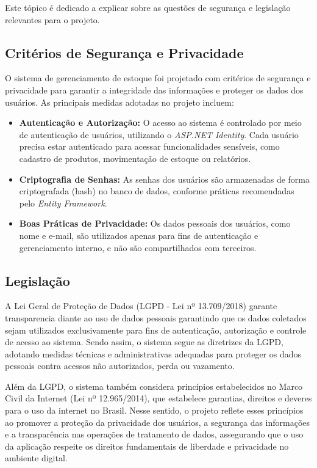 \documentclass[
	12pt,				%
	openany,			%
	twoside,			%
	a4paper,			%
	english,			%
	brazil				%
	]{abntex2}
\begin{document}
Este tópico é dedicado a explicar sobre as questões de segurança e legislação relevantes para o projeto.

\subsection{Critérios de Segurança e Privacidade}

O sistema de gerenciamento de estoque foi projetado com critérios de segurança e privacidade para garantir a integridade das informações e proteger os dados dos usuários. As principais medidas adotadas no projeto incluem:

\begin{itemize}
    \item \textbf{Autenticação e Autorização:} O acesso ao sistema é controlado por meio de autenticação de usuários, utilizando o \textit{ASP.NET Identity}. Cada usuário precisa estar autenticado para acessar funcionalidades sensíveis, como cadastro de produtos, movimentação de estoque ou relatórios.

    \item \textbf{Criptografia de Senhas:} As senhas dos usuários são armazenadas de forma criptografada (hash) no banco de dados, conforme práticas recomendadas pelo \textit{Entity Framework}.

    \item \textbf{Boas Práticas de Privacidade:} Os dados pessoais dos usuários, como nome e e-mail, são utilizados apenas para fins de autenticação e gerenciamento interno, e não são compartilhados com terceiros.
\end{itemize}

\subsection{Legislação}

A  Lei Geral de Proteção de Dados (LGPD - Lei nº 13.709/2018) garante transparencia diante ao uso de dados pessoais garantindo que os dados coletados sejam utilizados exclusivamente para fins de autenticação, autorização e controle de acesso ao sistema. Sendo assim, o sistema segue as diretrizes da LGPD, adotando medidas técnicas e administrativas adequadas para proteger os dados pessoais contra acessos não autorizados, perda ou vazamento. 

Além da LGPD, o sistema também considera princípios estabelecidos no Marco Civil da Internet (Lei nº 12.965/2014), que estabelece garantias, direitos e deveres para o uso da internet no Brasil. Nesse sentido, o projeto reflete esses princípios ao promover a proteção da privacidade dos usuários, a segurança das informações e a transparência nas operações de tratamento de dados, assegurando que o uso da aplicação respeite os direitos fundamentais de liberdade e privacidade no ambiente digital.
\end{document}
